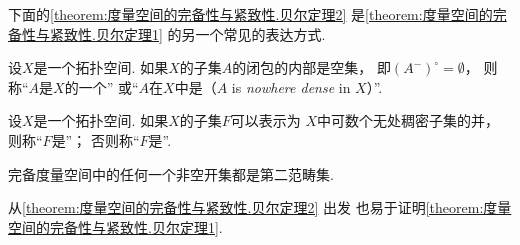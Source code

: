下面的\cref{theorem:度量空间的完备性与紧致性.贝尔定理2}
是\cref{theorem:度量空间的完备性与紧致性.贝尔定理1} 的另一个常见的表达方式.
\begin{definition}
设\(X\)是一个拓扑空间.
如果\(X\)的子集\(A\)的闭包的内部是空集，
即\((A^-)^\circ = \emptyset\)，
则称“\(A\)是\(X\)的一个”
或“\(A\)在\(X\)中是（\(A\) is \emph{nowhere dense} in \(X\)）”.
\end{definition}

\begin{definition}
设\(X\)是一个拓扑空间.
如果\(X\)的子集\(F\)可以表示为
\(X\)中可数个无处稠密子集的并，
则称“\(F\)是”；
否则称“\(F\)是”.
\end{definition}

\begin{theorem}[贝尔定理]\label{theorem:度量空间的完备性与紧致性.贝尔定理2}
完备度量空间中的任何一个非空开集都是第二范畴集.
\end{theorem}

从\cref{theorem:度量空间的完备性与紧致性.贝尔定理2} 出发
也易于证明\cref{theorem:度量空间的完备性与紧致性.贝尔定理1}.
